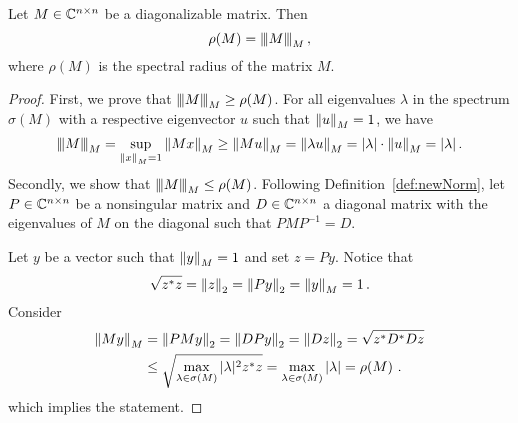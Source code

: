 \begin{thm}
\label{thm:norm}
Let $M\in\CC^{n\times n}$ be a diagonalizable matrix. Then %
$$
\rho(M)=\Mnorm{M}{M}\,,
$$
where $\rho(M)$ is the spectral radius of the matrix $M$. %
\end{thm}
\begin{proof}
First, we prove that $\Mnorm{M}{M}\geq\rho(M)$. For all eigenvalues $\lambda$ in the spectrum $\sigma(M)$ with a respective eigenvector $u$ such that $\norm{u}{M}=1$, we have
$$
\Mnorm{M}{M}=\sup_{\norm{x}{M}=1} \norm{Mx}{M}\geq \norm{Mu}{M}=\norm{\lambda u}{M}=|\lambda|\cdot\norm{u}{M}=|\lambda|\,.
$$
Secondly, we show that $\Mnorm{M}{M}\leq\rho(M)$. Following Definition~\ref{def:newNorm}, let $P\in\CC^{n\times n}$ be a  nonsingular matrix  and $D\in\CC^{n\times n}$ a diagonal matrix  with the eigenvalues of $M$ on the diagonal such that $PMP^{-1}=D$.

Let $y$ be a  vector such that $\norm{y}{M}=1$ and set $z=Py$. Notice that 
$$
\sqrt{z^*z}=\norm{z}{2}=\norm{Py}{2}=\norm{y}{M}=1\,.
$$
Consider
\begin{align*}
\norm{My}{M}&=\norm{PMy}{2}=\norm{DPy}{2}=\norm{Dz}{2}=\sqrt{z^*D^*Dz}\\
    &\leq \sqrt{\max_{\lambda\in\sigma(M)}|\lambda|^2 z^*z}=\max_{\lambda\in\sigma(M)}|\lambda|=\rho(M)\,\,.
\end{align*}
which implies the statement.
\end{proof}

